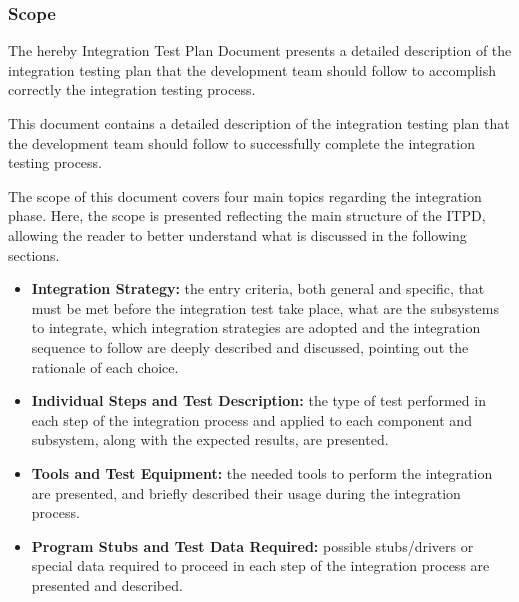 \subsubsection{Scope}

The hereby Integration Test Plan Document presents a detailed description of the integration testing plan that the development team should follow to accomplish correctly the integration testing process.

This document contains a detailed description of the integration testing plan that the development team should follow to successfully complete the integration testing process.

The scope of this document covers four main topics regarding the integration phase. Here, the scope is presented reflecting the main structure of the ITPD, allowing the reader to better understand what is discussed in the following sections.

\begin{itemize}
	\item \textbf{Integration Strategy:} the entry criteria, both general and specific, that must be met before the integration test take place, what are the subsystems to integrate, which integration strategies are adopted and the integration sequence to follow are deeply described and discussed, pointing out the rationale of each choice.
	\item \textbf{Individual Steps and Test Description:} the type of test performed in each step of the integration process and applied to each component and subsystem, along with the expected results, are presented.
	\item \textbf{Tools and Test Equipment:} the needed tools to perform the integration are presented, and briefly described their usage during the integration process.
	\item \textbf{Program Stubs and Test Data Required:} possible stubs/drivers or special data required to proceed in each step of the integration process are presented and described. 
\end{itemize}
